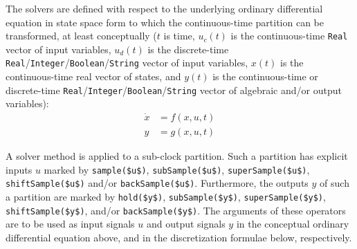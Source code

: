 The solvers are defined with respect to the underlying ordinary
differential equation in state space form to which the continuous-time
partition can be transformed, at least conceptually ($t$ is time,
$u_{c}(t)$ is the continuous-time \lstinline!Real! vector
of input variables, $u_{d}(t)$ is the
discrete-time \lstinline!Real!/\lstinline!Integer!/\lstinline!Boolean!/\lstinline!String! vector of input variables,
$x(t)$ is the continuous-time real vector of states, and
$y(t)$ is the continuous-time or discrete-time
\lstinline!Real!/\lstinline!Integer!/\lstinline!Boolean!/\lstinline!String! vector of algebraic and/or output variables):
\begin{align*}
\dot{x} &= f(x, u, t)\\
y &= g(x, u, t)
\end{align*}

A solver method is applied to a sub-clock partition.
Such a partition has explicit inputs $u$ marked by \lstinline!sample($u$)!, \lstinline!subSample($u$)!, \lstinline!superSample($u$)!, \lstinline!shiftSample($u$)! and/or \lstinline!backSample($u$)!.
Furthermore, the outputs $y$ of such a partition are marked by \lstinline!hold($y$)!, \lstinline!subSample($y$)!, \lstinline!superSample($y$)!, \lstinline!shiftSample($y$)!, and/or \lstinline!backSample($y$)!.
The arguments of these operators are to be used as input signals $u$ and output signals $y$ in the conceptual ordinary differential equation above, and in the discretization formulae below, respectively.

